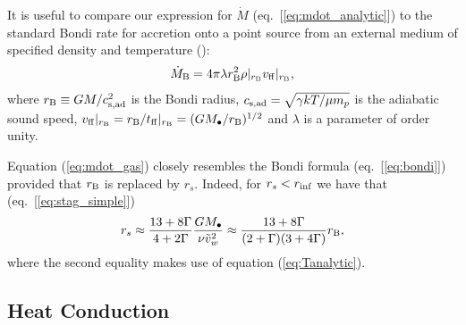 \documentclass[usenatbib,fleqn]{mn2e}
\newcommand{\rs}{r_s}
\newcommand{\vw}{\tilde{v}_{w}}
\newcommand{\Mbh}[1][]{M_{\bullet#1}}
\newcommand{\densSlope}{\nu}
\begin{document}
It is useful to compare our expression for $\dot{M}$ (eq.~[\ref{eq:mdot_analytic}]) to the standard Bondi rate for accretion onto a point source from an external medium of specified density and temperature (\citealt{Bondi52}):
\begin{align}
  \dot{M}_{\rm B} =4\pi \lambda r_{\rm B}^2 \rho|_{r_{\rm B}}v_{\rm
    ff}|_{r_{\rm B}},
\label{eq:bondi}
\end{align}
where $r_{\rm B} \equiv GM/c_{\rm s,ad}^{2}$ is the Bondi radius,
$c_{\rm s,ad} = \sqrt{\gamma kT/\mu m_p}$ is the adiabatic sound
speed, $v_{\rm ff}|_{r_{\rm B}} = r_{\rm B}/t_{\rm ff}|_{r_{\rm B}} =
(GM_{\bullet}/r_{\rm B})^{1/2}$ and $\lambda$ is a parameter of order
unity.

Equation (\ref{eq:mdot_gas}) closely resembles the Bondi formula (eq.~[\ref{eq:bondi}]) provided that $r_{\rm B}$ is replaced by $\rs$.  Indeed, for $r_{s} < r_{\rm inf}$ we have that (eq.~[\ref{eq:stag_simple}])
\begin{align}
  \rs\approx\frac{13+8\Gamma}{4+2\Gamma}\frac{G \Mbh}{\densSlope
    \vw^2} \approx \frac{13+8\Gamma}{(2+\Gamma)(3+4\Gamma)}r_{\rm B},
  \label{eq:rbondi}
\end{align}
where the second equality makes use of equation (\ref{eq:Tanalytic}).  

\subsection{Heat Conduction}
\label{sec:conductivity}
\end{document}
